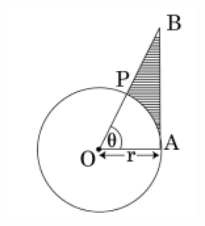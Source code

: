 \begin{enumerate}
	\begin{figure}[H]
      \centering
      \includegraphics[width=5cm]{figs/2016_10_9.png}
     \caption{}
     \label{figure_9}
\end{figure} 
\end{enumerate}
